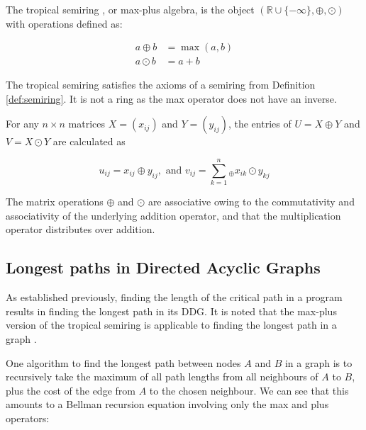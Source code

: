 \begin{definition}
  The tropical semiring \cite{Wandsnider2020}, or max-plus algebra, is the object $(\mathbb{R} \cup \{-\infty\}, \oplus, \odot)$ with operations 
defined as:

$$
\begin{aligned}
  a\oplus b &= \max(a,b) \\
  a\odot b &= a+b
\end{aligned}
$$

\end{definition}

The tropical semiring satisfies the axioms of a semiring from Definition \ref{def:semiring}. It
is not a ring as the max operator does not have an inverse.


\begin{definition}
For any $n\times n$ matrices $X = (x_{ij})$ and $Y = (y_{ij})$, the entries of $U = X \oplus Y$ and $V = X \odot Y$
are calculated as \cite{krivulin2012maxplusalgebraapproachmodelling}

$$
u_{ij} = x_{ij} \oplus y_{ij}, \text{ and } v_{ij} = \displaystyle\sum_{k=1}^{n} \! {}_{\oplus} x_{ik} \odot y_{kj}
$$

\end{definition}

The matrix operations $\oplus$ and $\odot$ are associative owing to the commutativity and associativity of the underlying 
addition operator, and that the multiplication operator distributes over addition.

\subsection{Longest paths in Directed Acyclic Graphs}



As established previously, finding the length of the critical path in a program results in finding the longest path
in its DDG. It is noted that the max-plus version of the tropical semiring is applicable to finding the longest path
in a graph \cite{krivulin2012maxplusalgebraapproachmodelling}.

One algorithm \cite{Chadderz} to find the longest path between nodes $A$ and $B$ in a graph is to recursively take the 
maximum of all path lengths from all neighbours of $A$ to $B$, plus the cost of the edge from $A$ to the chosen
neighbour. We can see that this amounts to a Bellman recursion equation \cite{Bellman:DynamicProgramming}
involving only the max and plus operators: 

